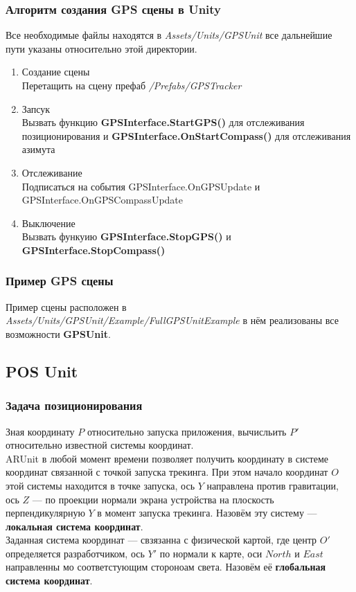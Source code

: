 \documentclass[a4paper, 11pt, titlepage]{article}
\begin{document}
    \subsubsection{Алгоритм создания GPS сцены в Unity}
      Все необходимые файлы находятся в \textit{Assets/Units/GPSUnit} все дальнейшие пути указаны относительно этой директории.
      \begin{enumerate}
        \item Создание сцены \\
          Перетащить на сцену префаб \textit{/Prefabs/GPSTracker}
        \item Запсук \\
          Вызвать функцию \textbf{GPSInterface.StartGPS()} для отслеживания позиционирования и \textbf{GPSInterface.OnStartCompass()} для отслеживания
          азимута
        \item Отслеживание \\
          Подписаться на события GPSInterface.OnGPSUpdate и GPSInterface.OnGPSCompassUpdate
        \item Выключение \\
          Вызвать функуию \textbf{GPSInterface.StopGPS()} и \textbf{GPSInterface.StopCompass()}
      \end{enumerate}

    \subsubsection{Пример GPS сцены}
      Пример сцены расположен в \textit{Assets/Units/GPSUnit/Example/FullGPSUnitExample} в нём реализованы все возможности \textbf{GPSUnit}.

    \subsection{POS Unit}
      \subsubsection{Задача позиционирования}
        Зная координату $P$ относительно запуска приложения, вычисльить $P'$ относительно известной системы координат. \\
        ARUnit в любой момент времени позволяет получить координату в системе координат связанной с точкой запуска трекинга. 
        При этом начало координат $O$ этой системы находится в точке запуска, ось $Y$ направлена против гравитации, ось $Z$ --- по 
        проекции нормали экрана устройства на плоскость перпендикулярную $Y$ в момент запуска трекинга. Назовём эту систему --- \textbf{локальная система координат}. \\
        Заданная система координат --- свзязанна с физической картой, где центр $O'$ определяется разработчиком, ось $Y'$ по нормали к карте, оси $North$ и $East$ направленны мо
        соответстующим стороноам света. Назовём её \textbf{глобальная система координат}.
\end{document}

